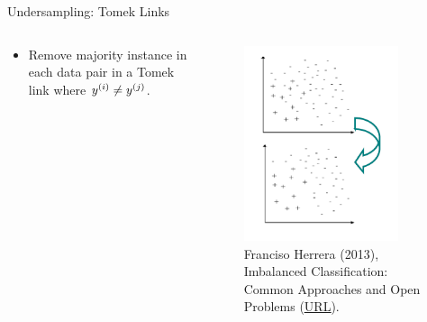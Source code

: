 \documentclass[11pt,compress,t,notes=noshow, xcolor=table]{beamer}
\begin{document}
\begin{frame}{Undersampling: Tomek Links}
{\begin{columns}
\begin{column}{0.7\textwidth}
\begin{itemize}
                \item Remove majority instance in each data pair in a Tomek link where $\yi \neq \yi[j]$.

                
                \end{itemize}		
            \end{column}
        
            \begin{column}{0.3\textwidth}
                \begin{figure}
                    \centering
                    \includegraphics[width=0.85\textwidth]{figure/tomek_link_plot.png}	
                    \tiny
                    \\ Franciso Herrera (2013), Imbalanced Classification: Common
                    Approaches and Open Problems (\href{https://sci2s.ugr.es/sites/default/files/files/TutorialsAndPlenaryTalks/SSTiC-Trends in-Classification-Imbalanced-data-sets.pdf}{\underline{URL}}).
                \end{figure}
            \end{column}
        \end{columns}
   }
\end{frame}
\end{document}
